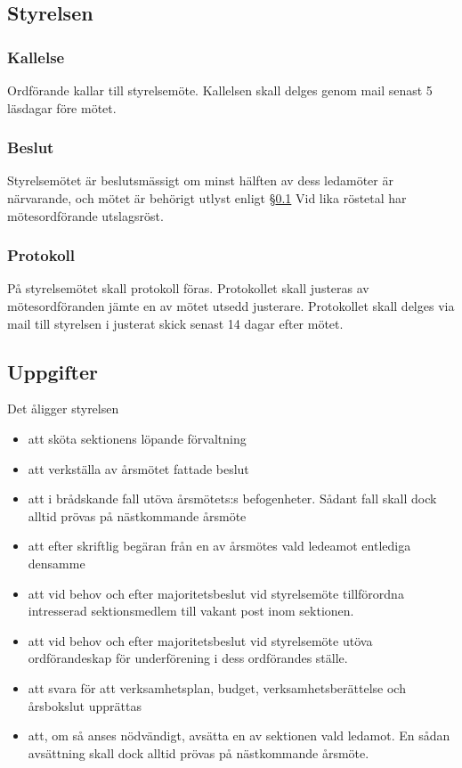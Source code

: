 \documentclass{dgovdoc}
\begin{document}
\subsection{Styrelsen}
\label{sec:styrelsen}

\subsubsection{Kallelse}

Ordförande kallar till styrelsemöte. Kallelsen skall delges genom mail senast 5 läsdagar före mötet.

\subsubsection{Beslut}

Styrelsemötet är beslutsmässigt om minst hälften av dess ledamöter är närvarande, och
mötet är behörigt utlyst enligt \S\ref{sec:styrelsen} Vid lika röstetal har
mötesordförande utslagsröst.

\subsubsection{Protokoll}

På styrelsemötet skall protokoll föras. Protokollet skall justeras av mötesordföranden
jämte en av mötet utsedd justerare. Protokollet skall delges via mail till styrelsen i justerat skick senast 14 dagar efter
mötet.

\subsection{Uppgifter}

Det åligger styrelsen

\begin{itemize}
  \item att sköta sektionens löpande förvaltning
  \item att verkställa av årsmötet fattade beslut
  \item att i brådskande fall utöva årsmötets:s befogenheter. Sådant fall skall dock
    alltid prövas på nästkommande årsmöte
  \item att efter skriftlig begäran från en av årsmötes vald ledeamot entlediga
    densamme
  \item att vid behov och efter majoritetsbeslut vid styrelsemöte tillförordna
    intresserad sektionsmedlem till vakant post inom sektionen.
  \item att vid behov och efter majoritetsbeslut vid styrelsemöte utöva ordförandeskap
    för underförening i dess ordförandes ställe.
  \item att svara för att verksamhetsplan, budget, verksamhetsberättelse och
    årsbokslut upprättas
  \item att, om så anses nödvändigt, avsätta en av sektionen vald ledamot.
    En sådan avsättning skall dock alltid prövas på nästkommande årsmöte.
\end{itemize}
\end{document}
